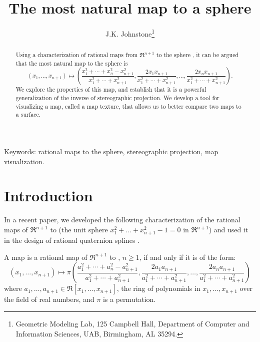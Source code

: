 \newif\ifFull
\Fullfalse

\SingleSpace

\setlength{\oddsidemargin}{0pt}
\setlength{\topmargin}{-.25in}	%
\setlength{\headsep}{3em}
\setlength{\textheight}{8.75in}
\setlength{\textwidth}{6.5in}
\setlength{\columnsep}{5mm}		%



\title{The most natural map to a sphere}
\author{J.K. Johnstone\thanks{Geometric Modeling Lab, 125 Campbell Hall, 
	Department of Computer and Information Sciences, 
	UAB, Birmingham, AL 35294.}}


\maketitle

\begin{abstract}
Using a characterization of rational maps
from $\Re^{n+1}$ to the sphere ,
it can be argued that the most natural map to the sphere is
\[ (x_1,\ldots,x_{n+1}) \mapsto 
	(\frac{x_1^2 + \cdots + x_{n}^2 - x_{n+1}^2}{x_1^2 + \cdots + x_{n+1}^2},
	 \frac{2x_1x_{n+1}}{x_1^2 + \cdots + x_{n+1}^2},\ldots,
	 \frac{2x_{n}x_{n+1}}{x_1^2 + \cdots + x_{n+1}^2}).
\]
We explore the properties of this map,
and establish that it is a powerful generalization
of the inverse of stereographic projection.
We develop a tool for visualizing a map, called a map texture,
that allows us to better compare two maps to a surface.
\end{abstract}

\noindent Keywords: rational maps to the sphere, stereographic projection,
	map visualization.

\clearpage

\section{Introduction}

In a recent paper, we developed 
the following characterization of the rational maps of $\Re^{n+1}$ to 
(the unit sphere $x_1^2 + \ldots + x_{n+1}^2 - 1 = 0$ in $\Re^{n+1}$)
and used it in the design of rational quaternion splines
\cite{jj+jimbo99}.

\begin{theorem}
\label{thm:nn}
A map is a rational map of $\Re^{n+1}$ to , $n \geq 1$, if and only if
it is of the form:
\begin{equation}
\label{eq:normalform}
	(x_{1},\ldots,x_{n+1}) \mapsto 
	\pi(\frac{a_1^2 + \cdots + a_{n}^2 - a_{n+1}^2}{a_1^2 + \cdots + a_{n+1}^2},
	 \frac{2a_1a_{n+1}}{a_1^2 + \cdots + a_{n+1}^2},
	 \ldots,
	 \frac{2a_{n}a_{n+1}}{a_1^2 + \cdots + a_{n+1}^2})
\end{equation}
where $a_1,\ldots,a_{n+1} \in \Re[x_1,\ldots,x_{n+1}]$,
the ring of polynomials in $x_1,\ldots,x_{n+1}$ over the field of real numbers,
and $\pi$ is a permutation.
\end{theorem}

